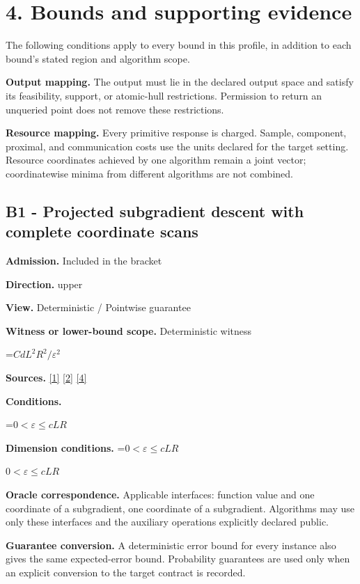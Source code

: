 \documentclass[10pt,a4paper]{article}
\newcommand{\AtlasMath}[1]{\par\begingroup\centering\setbox0=\hbox{$\displaystyle #1$}\ifdim\wd0>1.4\linewidth\typeout{ATLAS WIDE FORMULA: \the\wd0}\fi\ifdim\wd0>\linewidth\resizebox{\linewidth}{!}{\box0}\else\box0\fi\par\endgroup}
\newcommand{\AtlasInlineMath}[1]{\begingroup\setbox0=\hbox{$#1$}\ifdim\wd0>.4\linewidth\endgroup\AtlasMath{#1}\else\endgroup$#1$\fi}
\begin{document}
\section{4. Bounds and supporting evidence}
The following conditions apply to every bound in this profile, in addition to each bound's stated region and algorithm scope.

\textbf{Output mapping.} The output must lie in the declared output space and satisfy its feasibility, support, or atomic-hull restrictions. Permission to return an unqueried point does not remove these restrictions.

\textbf{Resource mapping.} Every primitive response is charged. Sample, component, proximal, and communication costs use the units declared for the target setting. Resource coordinates achieved by one algorithm remain a joint vector; coordinatewise minima from different algorithms are not combined.

\subsection{B1 - Projected subgradient descent with complete coordinate scans}
\textbf{Admission.} Included in the bracket

\textbf{Direction.} upper

\textbf{View.} Deterministic / Pointwise guarantee

\textbf{Witness or lower-bound scope.} Deterministic witness

\AtlasMath{CdL^2R^2/\varepsilon^2}
\textbf{Sources.} \href{https://arxiv.org/pdf/1405.4980}{[1]} \href{https://www2.isye.gatech.edu/~nemirovs/MOR_AccuracyCertificates.pdf}{[2]} \href{https://arxiv.org/pdf/2609.20701}{[4]}

\textbf{Conditions.} 
\AtlasMath{0<\varepsilon\le cLR}


\textbf{Dimension conditions.} \AtlasInlineMath{0<\varepsilon\le cLR}

\textbf{Oracle correspondence.} Applicable interfaces: function value and one coordinate of a subgradient, one coordinate of a subgradient. Algorithms may use only these interfaces and the auxiliary operations explicitly declared public.

\textbf{Guarantee conversion.} A deterministic error bound for every instance also gives the same expected-error bound. Probability guarantees are used only when an explicit conversion to the target contract is recorded.
\end{document}
